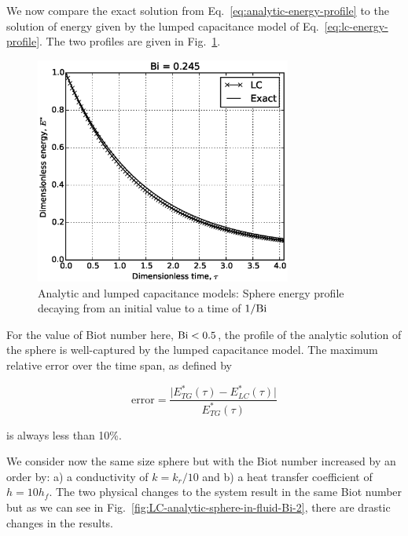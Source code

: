 We now compare the exact solution from Eq.~\ref{eq:analytic-energy-profile} to the solution of energy given by the lumped capacitance model of Eq.~\ref{eq:lc-energy-profile}. The two profiles are given in Fig.~\ref{fig:LC-analytic-sphere-in-fluid}. 

\begin{figure}[ht]
	\centering
		\includegraphics[width=0.75\textwidth]{chapters/figures/LC-analytic-sphere-in-fluid}
	\caption[Analytic temperature profile for $\Bi < 1$]{Analytic and lumped capacitance models: Sphere energy profile decaying from an initial value to a time of $1/\mathrm{Bi}$}
	\label{fig:LC-analytic-sphere-in-fluid}
\end{figure}

For the value of Biot number here, $\mathrm{Bi} < 0.5$, the profile of the analytic solution of the sphere is well-captured by the lumped capacitance model. The maximum relative error over the time span, as defined by

\begin{equation}\label{eq:error}
	\text{error} = \frac{\big|E^*_{TG}(\tau) - E^*_{LC}(\tau) \big|}{E^*_{TG}(\tau)}
\end{equation}

is always less than 10\%. 

We consider now the same size sphere but with the Biot number increased by an order by: a) a conductivity of $k = k_r/10$ and b) a heat transfer coefficient of $h = 10h_f$. The two physical changes to the system result in the same Biot number but as we can see in Fig.~\ref{fig:LC-analytic-sphere-in-fluid-Bi-2}, there are drastic changes in the results. 

